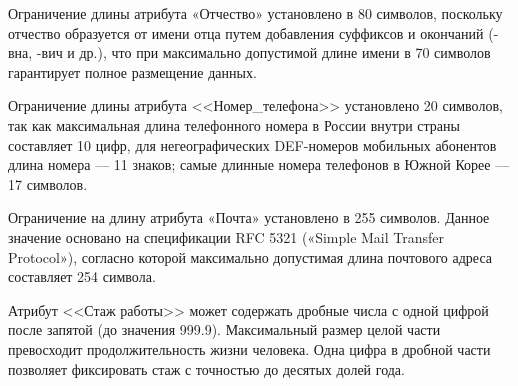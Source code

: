 Ограничение длины атрибута «Отчество» установлено в 80 символов, поскольку отчество образуется от имени отца путем добавления суффиксов и окончаний (-вна, -вич и др.), что при максимально допустимой длине имени в 70 символов гарантирует полное размещение данных.

Ограничение длины атрибута <<Номер\_телефона>> установлено 20 символов, так как максимальная длина телефонного номера в России внутри страны составляет 10 цифр, для негеографических DEF-номеров мобильных абонентов длина номера --- 11 знаков; самые длинные номера телефонов в Южной Корее --- 17 символов.  

Ограничение на длину атрибута «Почта» установлено в 255 символов. Данное значение основано на спецификации RFC 5321 («Simple Mail Transfer Protocol»), согласно которой максимально допустимая длина почтового адреса составляет 254 символа.

Атрибут <<Стаж работы>> может содержать дробные числа с одной цифрой после запятой (до значения 999.9). Максимальный размер целой части превосходит продолжительность жизни человека. Одна цифра в дробной части позволяет фиксировать стаж с точностью до десятых долей года. 

\begin{table}[H]
\centering
\caption{Рацион (Diet)}
\label{tab:Рацион}
\end{table}


